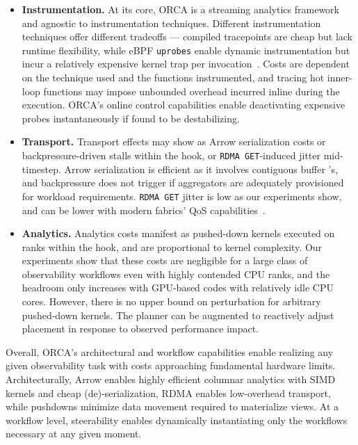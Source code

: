 \begin{itemize}
  \item \textbf{Instrumentation.
        }
        At its core, ORCA is a streaming analytics framework and agnostic to instrumentation techniques.
        Different instrumentation techniques offer different tradeoffs --- compiled tracepoints
        are cheap but lack runtime flexibility, while eBPF \texttt{uprobes} enable dynamic instrumentation
        but incur a relatively expensive kernel trap per invocation~\cite{Zheng2025:Uprobes}.
        Costs are dependent on the technique used and the functions instrumented,
        and tracing hot inner-loop functions may impose unbounded overhead incurred inline during the execution.
        ORCA's online control capabilities enable
        deactivating expensive probes instantaneously if found to be destabilizing.

  \item \textbf{Transport.
        }
        Transport effects may show as Arrow serialization costs or
        backpressure-driven stalls within the hook, or \texttt{RDMA GET}-induced jitter mid-timestep.
        Arrow serialization is efficient as it involves contiguous buffer \memcpy{}'s, and
        backpressure does not trigger if aggregators are adequately provisioned
        for workload requirements.
        \texttt{RDMA GET} jitter is low as our experiments show, and can be lower
        with modern fabrics' QoS capabilities~\cite{DeSe2020:Slingshot}.

  \item \textbf{Analytics.
        }
        Analytics costs manifest as pushed-down kernels executed on ranks
        within the hook, and are proportional to kernel complexity.
        Our experiments show that these costs are negligible
        for a large class of observability workflows even with highly contended CPU ranks, and the headroom
        only increases with
        GPU-based codes with relatively idle CPU cores.
        However, there is no upper bound on perturbation for arbitrary pushed-down kernels.
        The planner can be augmented
        to reactively adjust placement in response to observed performance impact.

\end{itemize}

Overall, ORCA's architectural and workflow capabilities enable realizing
any given observability task
with costs approaching fundamental hardware limits.
Architecturally, Arrow enables highly efficient columnar
analytics with SIMD kernels and cheap (de)-serialization, RDMA enables low-overhead transport,
while pushdowns minimize data movement required to materialize views.
At a workflow level, steerability enables
dynamically instantiating only the workflows necessary at any given moment.


